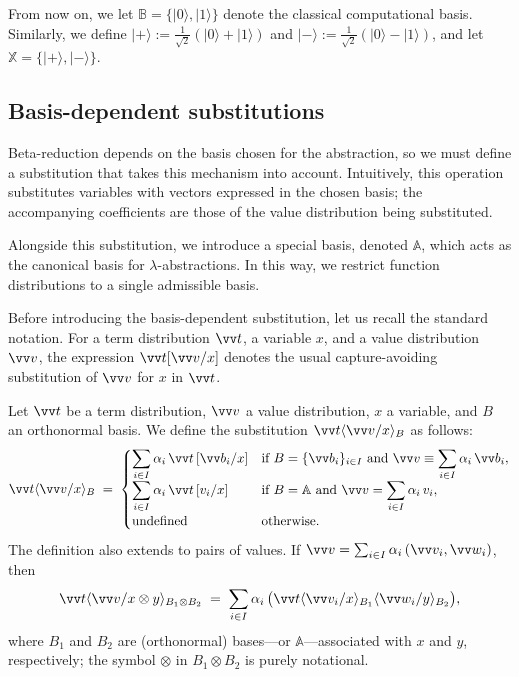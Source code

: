 \documentclass[runningheads,orivec,envcountsame,envcountsect]{llncs}
\newcommand\ket[1]{\ensuremath{|#1\rangle}}
\newcommand\ansubst[2]{\ensuremath{\langle #1 \rangle_{#2}}}
\newcommand\AbsBasis{\ensuremath{\mathbb{A}}}
\def\Pair#1#2{(#1,#2)} %
\def\ds{\displaystyle}
\newcommand\B{\mathbb B}
\newcommand\XB{\mathbb X}
\begin{document}
From now on, we let $\B=\{\ket{0},\ket{1}\}$ denote the classical computational
basis. Similarly, we define
$\ket{+}:=\frac 1{\sqrt{2}}(\ket{0}+\ket{1})$ and
$\ket{-}:=\frac 1{\sqrt{2}}(\ket{0}-\ket{1})$, and let
$\XB=\{\ket{+},\ket{-}\}$.

\subsection{Basis-dependent substitutions}
Beta-reduction depends on the basis chosen for the abstraction, so we must
define a substitution that takes this mechanism into account. Intuitively, this
operation substitutes variables with vectors expressed in the chosen basis; the
accompanying coefficients are those of the value distribution being
substituted.

Alongside this substitution, we introduce a special basis, denoted
$\AbsBasis$, which acts as the canonical basis for $\lambda$-abstractions. In
this way, we restrict function distributions to a single admissible basis.

Before introducing the basis-dependent substitution, let us recall the
standard notation. For a term distribution $\vv t$, a variable $x$, and a
value distribution $\vv v$, the expression $\vv t[\vv v/x]$ denotes the
usual capture-avoiding substitution of $\vv v$ for $x$ in $\vv t$.

\begin{definition}
  Let $\vv t$ be a term distribution, $\vv v$ a value distribution, $x$ a
  variable, and $B$ an orthonormal basis. We define the substitution
  $\vv t\ansubst{\vv v/x}{B}$ as follows:
  \[
    \vv t\ansubst{\vv v/x}{B} \;=\;
    \begin{cases}
      \ds\sum_{i\in I}\alpha_i\,\vv t\,[\vv b_i/x] &
        \text{if } B=\{\vv b_i\}_{i\in I}\ \text{and}\
        \vv v \equiv \ds\sum_{i\in I}\alpha_i\,\vv b_i,\\[6pt]
      \ds\sum_{i\in I}\alpha_i\,\vv t\,[v_i/x] &
        \text{if } B=\AbsBasis\ \text{and}\
        \vv v = \ds\sum_{i\in I}\alpha_i\,v_i,\\[2pt]
      \text{undefined} & \text{otherwise.}
    \end{cases}
  \]
  The definition also extends to pairs of values. If
  $\vv v=\sum_{i\in I}\alpha_i\,\Pair{\vv v_i}{\vv w_i}$, then
  \[
    \vv t\ansubst{\vv v/x\otimes y}{B_1\otimes B_2}
      \;=\; \sum_{i\in I}\alpha_i\,
      \bigl(\vv t\ansubst{\vv v_i/x}{B_1}\ansubst{\vv w_i/y}{B_2}\bigr),
  \]
  where $B_1$ and $B_2$ are (orthonormal) bases---or $\AbsBasis$---associated
  with $x$ and $y$, respectively; the symbol $\otimes$ in $B_1\otimes B_2$ is
  purely notational.
\end{definition}
\end{document}
